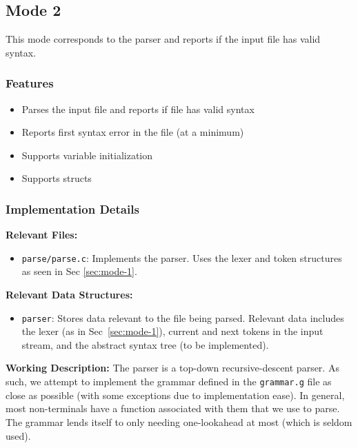 \subsection{Mode 2}
\label{sec:mode-2}

This mode corresponds to the parser and reports if the input file has valid syntax.

\subsubsection{Features}

\begin{itemize}
    \item Parses the input file and reports if file has valid syntax
    \item Reports first syntax error in the file (at a minimum)
    \item Supports variable initialization
    \item Supports structs
\end{itemize}

\subsubsection{Implementation Details}

\textbf{Relevant Files:}

\begin{itemize}
    \item \verb|parse/parse.c|: Implements the parser. Uses the lexer and token
    structures as seen in Sec \ref{sec:mode-1}.
\end{itemize}

\noindent \textbf{Relevant Data Structures:}

\begin{itemize}
    \item \verb|parser|: Stores data relevant to the file being parsed. Relevant
    data includes the lexer (as in Sec~\ref{sec:mode-1}), current and next
    tokens in the input stream, and the abstract syntax tree (to be
    implemented).
\end{itemize}

\noindent \textbf{Working Description:} The parser is a top-down
recursive-descent parser. As such, we attempt to implement the grammar defined
in the \verb|grammar.g| file as close as possible (with some exceptions due to
implementation ease). In general, most non-terminals have a function associated
with them that we use to parse. The grammar lends itself to only needing
one-lookahead at most (which is seldom used).

